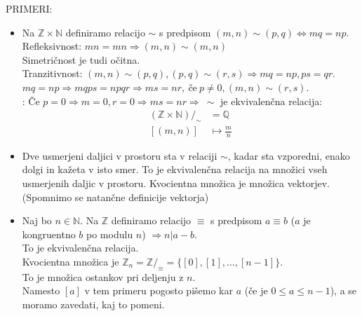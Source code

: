 \documentclass[a4paper,12pt]{article}
\begin{document}
PRIMERI:
\begin{itemize}
\item Na $\mathbb{Z}\times \mathbb{N}$ definiramo relacijo $\sim$ s predpisom $(m,n)\sim(p,q)\Leftrightarrow mq=np$.\\

Refleksivnost: $mn=mn\Rightarrow (m,n)\sim(m,n)$ \\

Simetričnost je tudi očitna.\\

Tranzitivnost: $(m,n)\sim(p,q),(p,q)\sim(r,s)\Rightarrow mq=np,ps=qr$. \\


$mq=np \Rightarrow mqps=npqr \Rightarrow ms=nr, ~\text{če}~ p \neq 0, (m,n)\sim(r,s)$. \\

: Če $p=0 \Rightarrow m=0,r=0 \Rightarrow ms=nr \Rightarrow ~ \sim$ je ekvivalenčna relacija:
\begin{align*}
(\mathbb{Z}\times \mathbb{N})/_\sim & = \mathbb{Q} \\
[(m,n)] & \mapsto \frac{m}{n}
\end{align*}

\item Dve usmerjeni daljici v prostoru sta v relaciji $\sim$, kadar sta vzporedni, enako dolgi in kažeta v isto smer. To je ekvivalenčna relacija na množici vseh usmerjenih daljic v prostoru. Kvocientna množica je množica vektorjev. (Spomnimo se natančne definicije vektorja) \\

\item Naj bo $n\in \mathbb{N}$. Na $\mathbb{Z}$ definiramo relacijo $\equiv$ s predpisom $a\equiv b$ ($a$ je kongruentno $b$ po modulu $n$) $\Rightarrow n | a-b$. \\

To je ekvivalenčna relacija.\\

Kvocientna množica je $\mathbb{Z}_n=\mathbb{Z}/_\equiv = \{[0],[1],\ldots,[n-1]\}$. \\

To je množica ostankov pri deljenju z $n$. \\

Namesto $[a]$ v tem primeru pogosto pišemo kar $a$ (če je $0\leq a \leq n-1$), a se moramo zavedati, kaj to pomeni. \\
\end{itemize}
\end{document}
